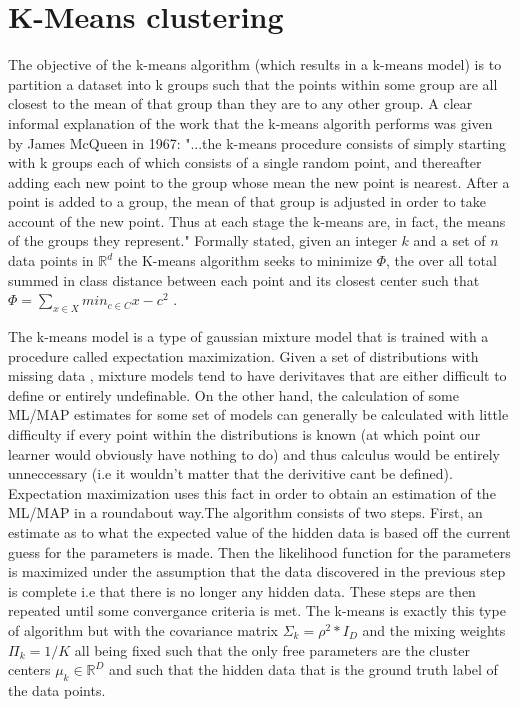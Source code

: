 {{\section{K-Means clustering}
The objective of the k-means algorithm (which results in a k-means model) is to partition
a dataset into k groups such that the points within some group are all closest to
the mean of that group than they are to any other group. A clear
informal explanation of the work that the k-means algorith performs
was given by James McQueen in 1967: "...the k-means procedure
consists of simply starting with k groups each of which consists of a
single random point, and thereafter adding each new point to the
group whose mean the new point is nearest. After a point is added to
a group, the mean of that group is adjusted in order to take account
of the new point. Thus at each stage the k-means are, in fact, the
means of the groups they represent." \cite{MacQueen} Formally stated,
given an integer $k$ and a set of $n$ data points in
$\mathbb{R}^{d}$ the K-means algorithm seeks to minimize  $\Phi$, the
over all total summed in class distance between each point and its
closest center such that $\mathbb \Phi = \sum_{x \in X} min_{c \in C}{x-c^{2}}$
\cite{Arthur}.

The k-means model is a type of gaussian mixture model that is trained with a procedure
called expectation maximization. Given a set of distributions with missing data
, mixture models tend to have derivitaves that are either difficult to define
or entirely undefinable. On the other hand, the calculation of some ML/MAP
estimates for some set of models can generally be calculated with little
difficulty if every point within the distributions is known (at which point our
learner would obviously have nothing to do) and thus calculus would be entirely
unneccessary (i.e it wouldn't matter that the derivitive cant be defined).
Expectation maximization uses this fact in order to obtain an estimation of the
ML/MAP in a roundabout way.The algorithm consists of two steps. First, an estimate as
to what the expected value of the hidden data is based off the current guess for the
parameters is made. Then the likelihood function for the parameters is maximized under
the assumption that the data discovered in the previous step is complete i.e that there
is no longer any hidden data. These steps are then repeated until some convergance criteria
is met. The k-means is exactly this type of algorithm but with the covariance matrix
$\Sigma_{k} = \rho^{2}*I_{D}$ and the mixing weights $\Pi_{k} = 1/K$ all being fixed such
that the only free parameters are the cluster centers $\mu_{k} \in \mathbb{R}^{D}$
and such that the hidden data that is the ground truth label of the data points.
}}
